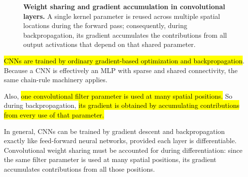 \begin{figure}[htbp]
    \caption{\textbf{Weight sharing and gradient accumulation in convolutional layers.} A single kernel parameter is reused across multiple spatial locations during the forward pass; consequently, during backpropagation, its gradient accumulates the contributions from all output activations that depend on that shared parameter.}
    \label{fig:cnn-weight-sharing-backpropagation}
\end{figure}

\begin{takeawaysbox}
    \hl{CNNs are trained by ordinary gradient-based optimization and backpropagation}. Because a CNN is effectively an MLP with sparse and shared connectivity, the same chain-rule machinery applies.

    \highspace
    Also, \hl{one convolutional filter parameter is used at many spatial positions.} So during backpropagation, \hl{its gradient is obtained by accumulating contributions from every use of that parameter.}

    \highspace
    In general, CNNs can be trained by gradient descent and backpropagation exactly like feed-forward neural networks, provided each layer is differentiable. Convolutional weight sharing must be accounted for during differentiation: since the same filter parameter is used at many spatial positions, its gradient accumulates contributions from all those positions.
\end{takeawaysbox}